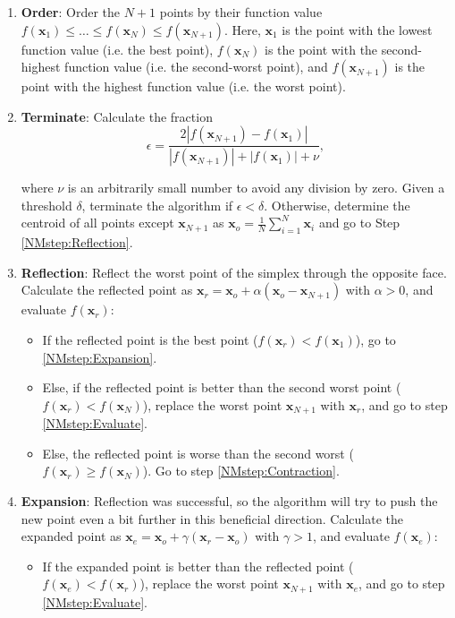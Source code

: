 \documentclass[a4paper,11pt]{article}
\def\x{\boldsymbol{x}}
\begin{document}
\begin{enumerate}
 \item \label{NMstep:Evaluate} \textbf{Order}: Order the $N+1$ points by their function value $f(\x_1) \leq \ldots \leq f(\x_N) \leq f(\x_{N+1})$. Here, $\x_1$ is the point with the lowest function value (i.e. the best point), $f(\x_N)$ is the point with the second-highest function value (i.e. the second-worst point), and $f(\x_{N+1})$ is the point with the highest function value (i.e. the worst point).
 \item \textbf{Terminate}: Calculate the fraction
\begin{equation}\label{eq:NMTerminate}
\epsilon = \dfrac{2|f(\x_{N+1}) - f(\x_1)|}{|f(\x_{N+1})| + |f(\x_1)| + \nu},
\end{equation}

where $\nu$ is an arbitrarily small number to avoid any division by zero. Given a threshold $\delta$, terminate the algorithm if $\epsilon < \delta$. Otherwise, determine the centroid of all points except $\x_{N+1}$ as $\x_o = \frac{1}{N}\sum_{i=1}^{N} \x_i$ and go to Step \ref{NMstep:Reflection}.
 \item \label{NMstep:Reflection} \textbf{Reflection}: Reflect the worst point of the simplex through the opposite face. Calculate the reflected point as $\x_r = \x_o + \alpha(\x_o - \x_{N+1})$ with $\alpha > 0$, and evaluate $f(\x_r)$:
 \begin{itemize}
  \item  If the reflected point is the best point ($f(\x_r) < f(\x_1)$), go to \ref{NMstep:Expansion}.
  \item Else, if the reflected point is better than the second worst point ($f(\x_r) < f(\x_N)$), replace the worst point $\x_{N+1}$ with $\x_r$, and go to step \ref{NMstep:Evaluate}.
  \item Else, the reflected point is worse than the second worst ($f(\x_r) \geq f(\x_N)$). Go to step \ref{NMstep:Contraction}.
 \end{itemize}
 \item \label{NMstep:Expansion} \textbf{Expansion}: Reflection was successful, so the algorithm will try to push the new point even a bit further in this beneficial direction. Calculate the expanded point as $\x_e = \x_o + \gamma(
\x_r - \x_o)$ with $\gamma > 1$, and evaluate $f(\x_e)$:
 \begin{itemize}
  \item If the expanded point is better than the reflected point ($f(\x_e) < f(\x_r)$), replace the worst point $\x_{N+1}$ with $\x_e$, and go to step \ref{NMstep:Evaluate}.

\end{itemize}
\end{enumerate}
\end{document}

